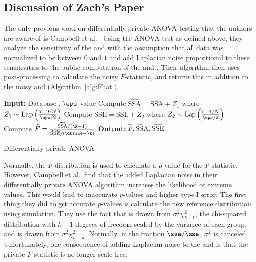 \subsection{Discussion of Zach's Paper}
The only previous work on differentially private ANOVA testing that the authors are aware of is Campbell et al.~\cite{Campbell2018DifferentiallyPA} Using the ANOVA test as defined above, they analyze the sensitivity of the \ssa and \sse with the assumption that all data was normalized to be between $0$ and $1$ and add Laplacian noise proportional to these sensitivities to the public computation of the \ssa and \sse. Their algorithm then uses post-processing to calculate the noisy $F$-statistic, and returns this in addition to the noisy \ssa and \sse (Algorithm~\ref{alg:Fhat}). 
\begin{algorithm}
    \begin{algorithmic}
        \STATE \textbf{Input:} Database \x, $\eps$ value
        \STATE Compute $\widehat{\text{SSA}} = \text{SSA} + Z_1$ where $Z_1\sim\text{Lap}\left(\frac{7 - 9/N}{\eps/2}\right)$
        \STATE Compute $\widehat{\text{SSE}} = \text{SSE} + Z_2$ where $Z_2\sim\text{Lap}\left(\frac{5-4/N}{\eps/2}\right)$
        \STATE Compute $\widehat{F} = \frac{\widehat{\text{SSA}}/(\k-1)}{\widehat{\text{SSE}}/(\dbsize-\k)}$
        \STATE \textbf{Output:} $\widehat{F}, \widehat{\text{SSA}}, \widehat{\text{SSE}}$
    \end{algorithmic}
    \caption{Differentially private ANOVA} 
     \label{alg:Fhat}
\end{algorithm}

Normally, the $F$-distribution is used to calculate a $p$-value for the $F$-statistic. However, Campbell et al.~find that the added Laplacian noise in their differentially private ANOVA algorithm increases the likelihood of extreme values. This would lead to inaccurate $p$-values and higher type I error. The first thing they did to get accurate $p$-values is calculate the new reference distribution using simulation. They use the fact that \ssa  is drawn from $\sigma^2 \chi_{k-1}^2$, the chi-squared distribution with $k-1$ degrees of freedom scaled by the variance of each group, and \sse is drawn from $\sigma^2 \chi_{n-k}^2$. Normally, in the fraction $\ssa/\sse$, $\sigma^2$ is canceled. Unfortunately, one consequence of adding Laplacian noise to the \ssa and \sse is that the private $F$-statistic is no longer scale-free. 

